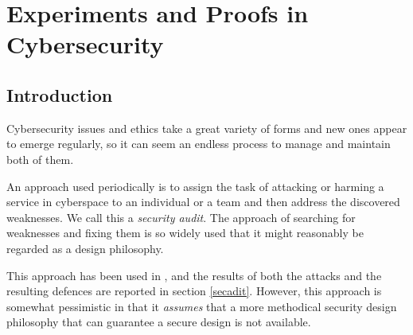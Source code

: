 
\chapter{Experiments and Proofs in Cybersecurity }\label{Ch4}
\section{Introduction}
\thispagestyle{empty}
\pagestyle{empty}
% 
% 
% 
% 


Cybersecurity issues and ethics take a great variety of forms and new ones appear to emerge regularly, so it can seem an endless process to manage and maintain both of them\cite{josang2005user}. 

An approach used periodically is to assign the task of attacking or harming a service in cyberspace to an individual or a team and then address the discovered weaknesses. We call this a {\em security audit}. The approach of searching for weaknesses and fixing them is so widely used that it might reasonably be regarded as a design philosophy.

This approach has been used in \cite{sheniar2018experiments}, and the results of both the attacks and the resulting defences are reported in section \ref{secadit}. However, this approach is somewhat pessimistic in that it {\em assumes} that a more methodical security design philosophy that can guarantee a secure design is not available. 

